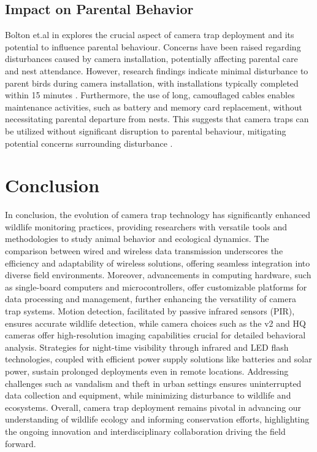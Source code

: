 \documentclass[class=report,11pt,crop=false]{standalone}
\begin{document}
\subsection{Impact on Parental Behavior}
Bolton et.al in \cite{bolton2007remote} explores the crucial aspect of camera trap deployment and its potential to influence parental behaviour. Concerns have been raised regarding disturbances caused by camera installation, potentially affecting parental care and nest attendance. However, research findings indicate minimal disturbance to parent birds during camera installation, with installations typically completed within 15 minutes \cite{bolton2007remote}. Furthermore, the use of long, camouflaged cables enables maintenance activities, such as battery and memory card replacement, without necessitating parental departure from nests. This suggests that camera traps can be utilized without significant disruption to parental behaviour, mitigating potential concerns surrounding disturbance \cite{bolton2007remote}.

\section{Conclusion}

In conclusion, the evolution of camera trap technology has significantly enhanced wildlife monitoring practices, providing researchers with versatile tools and methodologies to study animal behavior and ecological dynamics. The comparison between wired and wireless data transmission underscores the efficiency and adaptability of wireless solutions, offering seamless integration into diverse field environments. Moreover, advancements in computing hardware, such as single-board computers and microcontrollers, offer customizable platforms for data processing and management, further enhancing the versatility of camera trap systems. Motion detection, facilitated by passive infrared sensors (PIR), ensures accurate wildlife detection, while camera choices such as the v2 and HQ cameras offer high-resolution imaging capabilities crucial for detailed behavioral analysis. Strategies for night-time visibility through infrared and LED flash technologies, coupled with efficient power supply solutions like batteries and solar power, sustain prolonged deployments even in remote locations. Addressing challenges such as vandalism and theft in urban settings ensures uninterrupted data collection and equipment, while minimizing disturbance to wildlife and ecosystems. Overall, camera trap deployment remains pivotal in advancing our understanding of wildlife ecology and informing conservation efforts, highlighting the ongoing innovation and interdisciplinary collaboration driving the field forward.

\ifstandalone

\printnoidxglossary[type=\acronymtype,nonumberlist]
\fi
\end{document}

